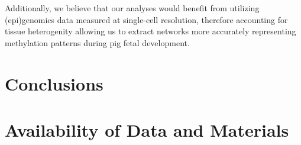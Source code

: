 \documentclass[
	a4paper, %
	10pt, %
	unnumberedsections, %
	twoside, %
]{LTJournalArticle}
\begin{document}
Additionally, we believe that our analyses would benefit from utilizing (epi)genomics
data measured at single-cell resolution, therefore accounting for tissue heterogenity
allowing us to extract networks more accurately representing methylation 
patterns during pig fetal development.


\section{\large Conclusions}


\section{\large Availability of Data and Materials}

\end{document}
